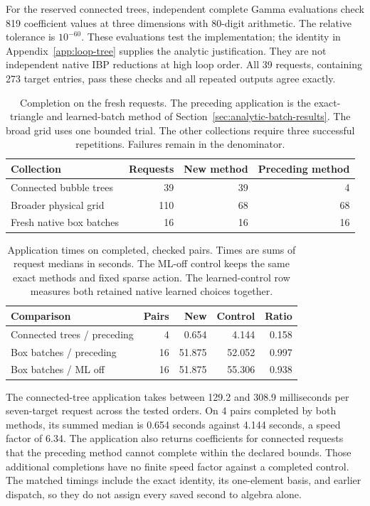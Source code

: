 For the reserved connected trees, independent complete Gamma evaluations check 819 coefficient values at three dimensions with 80-digit arithmetic. The relative tolerance is $10^{-60}$. These evaluations test the implementation; the identity in Appendix~\ref{app:loop-tree} supplies the analytic justification. They are not independent native IBP reductions at high loop order. All 39 requests, containing 273 target entries, pass these checks and all repeated outputs agree exactly.

\begin{table}[!htbp]\centering\small
\caption{Completion on the fresh requests. The preceding application is the exact-triangle and learned-batch method of Section~\ref{sec:analytic-batch-results}. The broad grid uses one bounded trial. The other collections require three successful repetitions. Failures remain in the denominator.}
\label{tab:loop-tree-completion}
\begin{tabularx}{\linewidth}{@{}Yrrr@{}}\toprule
Collection & Requests & New method & Preceding method\\\midrule
Connected bubble trees & 39 & 39 & 4 \\
Broader physical grid & 110 & 68 & 68 \\
Fresh native box batches & 16 & 16 & 16 \\
\bottomrule\end{tabularx}\end{table}

\begin{table}[!htbp]\centering\small
\caption{Application times on completed, checked pairs. Times are sums of request medians in seconds. The ML-off control keeps the same exact methods and fixed sparse action. The learned-control row measures both retained native learned choices together.}
\label{tab:loop-tree-times}
\begin{tabularx}{\linewidth}{@{}Yrrrr@{}}\toprule
Comparison & Pairs & New & Control & Ratio\\\midrule
Connected trees / preceding & 4 & 0.654 & 4.144 & 0.158 \\
Box batches / preceding & 16 & 51.875 & 52.052 & 0.997 \\
Box batches / ML off & 16 & 51.875 & 55.306 & 0.938 \\
\bottomrule\end{tabularx}\end{table}

The connected-tree application takes between 129.2 and 308.9 milliseconds per seven-target request across the tested orders. On 4 pairs completed by both methods, its summed median is 0.654 seconds against 4.144 seconds, a speed factor of 6.34. The application also returns coefficients for connected requests that the preceding method cannot complete within the declared bounds. Those additional completions have no finite speed factor against a completed control. The matched timings include the exact identity, its one-element basis, and earlier dispatch, so they do not assign every saved second to algebra alone.


